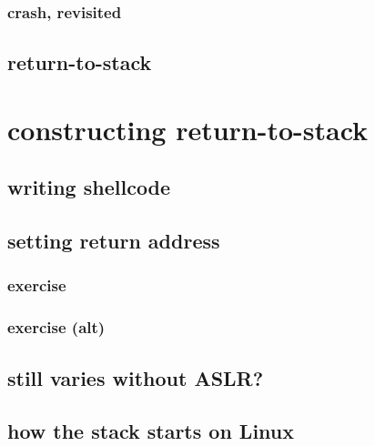 \subsubsection{crash, revisited}


\subsection{return-to-stack}


\section{constructing return-to-stack}


\subsection{writing shellcode}




\subsection{setting return address}


\subsubsection{exercise}


\subsubsection{exercise (alt)}



\subsection{still varies without ASLR?}


\subsection{how the stack starts on Linux}


